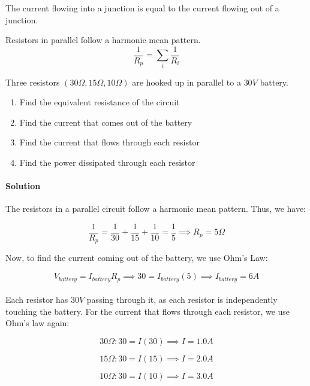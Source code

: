 \documentclass{scrartcl}
\theoremstyle{definition}
\begin{document}
	\begin{theorem}
		The current flowing into a junction is equal to the current flowing out of a junction.
	\end{theorem}
	
	\begin{theorem}
		Resistors in parallel follow a harmonic mean pattern.
		$$
		\frac{1}{R_p} = \sum_i \frac{1}{R_i}
		$$
	\end{theorem}
	
	\begin{example}
		Three resistors $(30 \Omega, 15 \Omega, 10 \Omega)$ are hooked up in parallel to a $30V$ battery.
		\begin{enumerate}
			\item  Find the equivalent resistance of the circuit
			\item  Find the current that comes out of the battery
			\item  Find the current that flows through each resistor
			\item  Find the power dissipated through each resistor
		\end{enumerate}
	\end{example}
	
	\paragraph{Solution} The resistors in a parallel circuit follow a harmonic mean pattern. Thus, we have:
	
	$$
	\frac{1}{R_p} = \frac{1}{30} + \frac{1}{15} + \frac{1}{10} = \frac{1}{5} \implies \boxed{R_p = 5 \Omega}
	$$
	
	\noindent Now, to find the current coming out of the battery, we use Ohm's Law:
	
	$$
	V_{battery} = I_{battery} R_p \implies 30 = I_{battery} (5) \implies \boxed{I_{battery} = 6 A}
	$$ \\ 
	
	\noindent Each resistor has $30V$ passing through it, as each resistor is independently touching the battery. For the current that flows through each resistor, we use Ohm's law again:
	
	$$
	30\Omega : 30 = I(30) \implies \boxed{I = 1.0 A}
	$$
	
	$$
	15 \Omega: 30 = I(15) \implies \boxed{I = 2.0A}
	$$
	
	$$
	10 \Omega: 30 = I(10) \implies \boxed{I = 3.0A}
	$$
	
\end{document}
